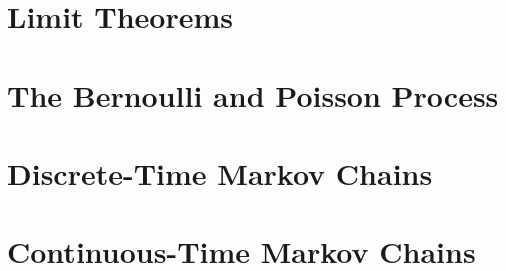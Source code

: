 	\chapter{Limit Theorems}

	\chapter{The Bernoulli and Poisson Process}

	\chapter{Discrete-Time Markov Chains}

	\chapter{Continuous-Time Markov Chains}